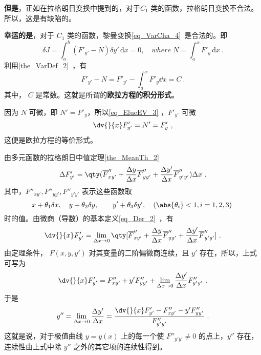 \textbf{但是}，正如在拉格朗日变换中提到的，对于$C_1$ 类的函数，拉格朗日变换不合法。所以，这是有缺陷的。

\textbf{幸运的是}，对于 $C_1$ 类的函数，黎曼变换\autoref{eq_VarCha_4}~是合法的。即
\begin{equation}
\delta J=\int_a^b \left(F'_{y'}-N \right) \delta y' \,\mathrm{d}{x}=0  ,\quad where \;N=\int_a^xF'_y \,\mathrm{d}{x} ~.
\end{equation}
利用\autoref{the_VarDef_2}~，有
\begin{equation}\label{eq_ElueEV_3}
F'_{y'}-N=F'_{y'}-\int_a^xF'_y\dd x=C~.
\end{equation}
其中， $C$ 是常数。这就是所谓的\textbf{欧拉方程的积分形式}。

因为 $N$ 可微，即 $N'=F'_y$，所以\autoref{eq_ElueEV_3} ，$F'_{y'}$ 可微
\begin{equation}
\dv{}{x}F'_{y'}=N'=F'_y~,
\end{equation}
这便是欧拉方程的等价形式。

由多元函数的拉格朗日中值定理\autoref{the_MeanTh_2}~
\begin{equation}
\Delta F'_{y'}=\qty(\overline{F}''_{xy'}+\frac{\Delta y}{\Delta x}\overline{F}''_{yy'}+\frac{\Delta y'}{\Delta x}\overline{F}''_{y'y'})\Delta x~.
\end{equation}
其中，$\overline{F}''_{xy'},\overline{F}''_{yy'},\overline{F}''_{y'y'}$ 表示这些函数取
\begin{equation}
x+\theta_1\delta x,\quad y+\theta_2\delta y,\quad \quad y'+\theta_3\delta y',\quad (\abs{\theta_i}<1,i=1,2,3)~
\end{equation}
时的值。由微商（导数）的基本定义\autoref{eq_Der_2}~，有
\begin{equation}
\dv{}{x}F'_{y'}=\lim_{\Delta x\rightarrow 0}\qty[\overline{F}''_{xy'}+\frac{\Delta y}{\Delta x}\overline{F}''_{yy'}+\frac{\Delta y'}{\Delta x}\overline{F}''_{y'y'}]~.
\end{equation}
由定理条件， $F(x,y,y')$ 对其变量的二阶偏微商连续，且 $y'$ 存在，所以，上式可写为
\begin{equation}
\dv{}{x}F'_{y'}=F''_{xy'}+y'F''_{yy'}+\lim_{\Delta x\rightarrow0}\frac{\Delta y'}{\Delta x}F''_{y'y'}~.
\end{equation}
于是
\begin{equation}
y''=\lim_{\Delta x\rightarrow0}\frac{\Delta y'}{\Delta x}=\frac{\dv{}{x}F'_{y'}-F''_{xy'}-y'F''_{yy'}}{F''_{y'y'}}~.
\end{equation}
这就是说，对于极值曲线 $y=y(x)$ 上的每一个使 $F''_{y'y'}\neq0$ 的点上，$y''$ 存在，连续性由上式中除 $y''$ 之外的其它项的连续性得到。